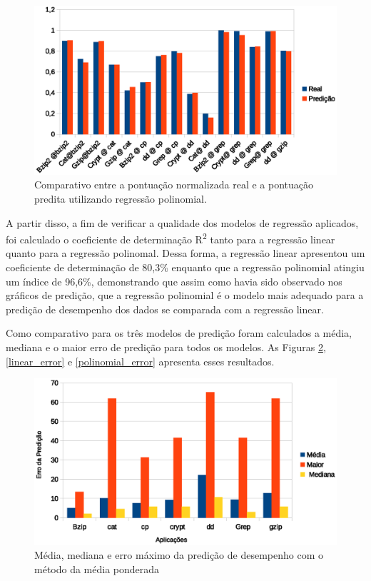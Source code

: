 \begin{figure}[!htb]
\centering
\includegraphics [keepaspectratio=true,scale=0.5]{graficos/poli.eps}
\caption{Comparativo entre a pontuação normalizada real e a pontuação predita utilizando regressão polinomial.}
\label{poli_predict}
\end{figure}  

A partir disso, a fim de verificar a qualidade dos modelos de regressão
aplicados, foi calculado o coeficiente de determinação R\textsuperscript{2}
tanto para a regressão linear quanto para a regressão polinomal. Dessa forma, a
regressão linear apresentou um coeficiente de determinação de 80,3\% enquanto
que a regressão polinomial atingiu um índice de 96,6\%, demonstrando que assim
como havia sido observado nos gráficos de predição, que a regressão polinomial
é o modelo mais adequado para a predição de desempenho dos dados se comparada
com a regressão linear.   

Como comparativo para os três modelos de predição foram calculados a média,
mediana e o maior erro de predição para todos os modelos. As Figuras
\ref{mean_error}, \ref{linear_error} e \ref{polinomial_error} apresenta esses
resultados.

\begin{figure}[!htb]
\centering
\includegraphics [keepaspectratio=true,scale=0.5]{graficos/mean_error.eps}
\caption{Média, mediana e erro máximo da predição de desempenho com o método da média ponderada}
\label{mean_error}
\end{figure}  

